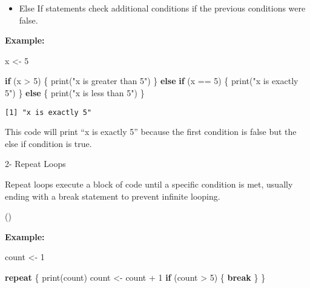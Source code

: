 \documentclass[
  man,
  floatsintext,
  longtable,
  nolmodern,
  notxfonts,
  notimes,
  colorlinks=true,linkcolor=blue,citecolor=blue,urlcolor=blue]{apa7}
\newenvironment{Shaded}{\begin{snugshade}}{\end{snugshade}}
\newcommand{\ControlFlowTok}[1]{\textcolor[rgb]{0.00,0.23,0.31}{\textbf{#1}}}
\newcommand{\DecValTok}[1]{\textcolor[rgb]{0.68,0.00,0.00}{#1}}
\newcommand{\FunctionTok}[1]{\textcolor[rgb]{0.28,0.35,0.67}{#1}}
\newcommand{\NormalTok}[1]{\textcolor[rgb]{0.00,0.23,0.31}{#1}}
\newcommand{\OtherTok}[1]{\textcolor[rgb]{0.00,0.23,0.31}{#1}}
\newcommand{\SpecialCharTok}[1]{\textcolor[rgb]{0.37,0.37,0.37}{#1}}
\newcommand{\StringTok}[1]{\textcolor[rgb]{0.13,0.47,0.30}{#1}}
\providecommand{\tightlist}{%
  \setlength{\itemsep}{0pt}\setlength{\parskip}{0pt}}
\begin{document}
\begin{itemize}
\tightlist
\item
  Else If statements check additional conditions if the previous
  conditions were false.
\end{itemize}

\textbf{Example:}

\begin{Shaded}
\begin{Highlighting}[]
\NormalTok{x }\OtherTok{\textless{}{-}} \DecValTok{5}

\ControlFlowTok{if}\NormalTok{ (x }\SpecialCharTok{\textgreater{}} \DecValTok{5}\NormalTok{) \{}
  \FunctionTok{print}\NormalTok{(}\StringTok{"x is greater than 5"}\NormalTok{)}
\NormalTok{\} }\ControlFlowTok{else} \ControlFlowTok{if}\NormalTok{ (x }\SpecialCharTok{==} \DecValTok{5}\NormalTok{) \{}
  \FunctionTok{print}\NormalTok{(}\StringTok{"x is exactly 5"}\NormalTok{)}
\NormalTok{\} }\ControlFlowTok{else}\NormalTok{ \{}
  \FunctionTok{print}\NormalTok{(}\StringTok{"x is less than 5"}\NormalTok{)}
\NormalTok{\}}
\end{Highlighting}
\end{Shaded}

\begin{verbatim}
[1] "x is exactly 5"
\end{verbatim}

This code will print ``x is exactly 5'' because the first condition is
false but the else if condition is true.

2- Repeat Loops

Repeat loops execute a block of code until a specific condition is met,
usually ending with a break statement to prevent infinite looping.

()

\textbf{Example:}

\begin{Shaded}
\begin{Highlighting}[]
\NormalTok{count }\OtherTok{\textless{}{-}} \DecValTok{1}

\ControlFlowTok{repeat}\NormalTok{ \{}
  \FunctionTok{print}\NormalTok{(count)}
\NormalTok{  count }\OtherTok{\textless{}{-}}\NormalTok{ count }\SpecialCharTok{+} \DecValTok{1}
  \ControlFlowTok{if}\NormalTok{ (count }\SpecialCharTok{\textgreater{}} \DecValTok{5}\NormalTok{) \{}
    \ControlFlowTok{break}
\NormalTok{  \}}
\NormalTok{\}}
\end{Highlighting}
\end{Shaded}
\end{document}
